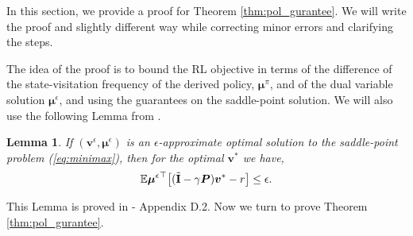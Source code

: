 \documentclass{article}
\newtheorem{lemma}{Lemma}
\DeclarePairedDelimiter\brs{[}{]}%
\newcommand{\E}{\mathbb{E}}
\newcommand{\Pb}{\boldsymbol{P}}
\newcommand{\vb}{\boldsymbol{v}}
\newcommand{\mub}{\boldsymbol{\mu}}
\newcommand{\vbe}{{\vb^\epsilon}}
\newcommand{\mube}{{\mub^\epsilon}}
\newcommand{\mubpi}{{\mub^\pi}}
\newcommand{\Ibt}{\tilde{\textbf{I}}}
\begin{document}
In this section, we provide a proof for Theorem \ref{thm:pol_gurantee}.
We will write the proof and slightly different way while correcting minor errors and clarifying the steps.

The idea of the proof is to bound the RL objective in terms of the difference of the state-visitation frequency of the derived policy, $\mubpi$, and of the dual variable solution  $\mube$, and using the guarantees on the saddle-point solution.
We will also use the following Lemma from \citet{jin20efficiently}.
\begin{lemma} \label{lem:v_star}
If $(\vbe, \mube)$ is an $\epsilon$-approximate optimal solution to the saddle-point problem (\ref{eq:minimax}), then for the optimal $\vb^*$ we have,
\begin{equation}  
    \E {\mube}^\top  \brs*{(\Ibt - \gamma \Pb) \vb^* - r} \leq \epsilon.
\end{equation}
\end{lemma}

This Lemma is proved in \citet{jin20efficiently} - Appendix D.2.
Now we turn to prove Theorem \ref{thm:pol_gurantee}.
\end{document}
